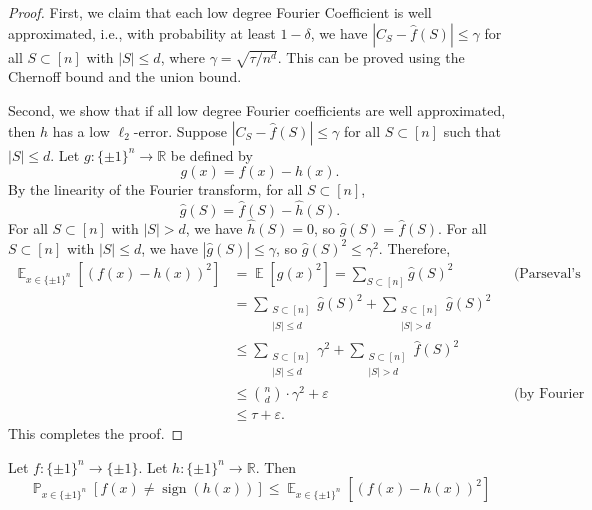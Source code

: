 \documentclass[letterpaper, reqno,11pt]{article}
\newcommand{\RR}{\mathbb{R}}
\newcommand{\PP}{\mathop{{}\mathbb{P}}}
\newcommand{\EE}{\mathop{{}\mathbb{E}}}
\DeclareMathOperator{\sign}{sign}
\begin{document}
\begin{proof}
  First, we claim that each low degree Fourier Coefficient is well approximated, i.e., with probability at least $1 - \delta$, we have $|C_S - \hat{f}(S)| \leq \gamma$ for all $S \subset [n]$ with $|S| \leq d$, where $\gamma = \sqrt{\tau/n^d}$. This can be proved using the Chernoff bound and the union bound.

  Second, we show that if all low degree Fourier coefficients are well approximated, then $h$ has a low $\ell_2$-error. Suppose $|C_S - \hat{f}(S)| \leq \gamma$ for all $S \subset [n]$ such that $|S| \leq d$. Let $g : \{ \pm 1 \}^n \to \RR$ be defined by
  $$ g(x) = f(x) - h(x). $$
  By the linearity of the Fourier transform, for all $S \subset [n]$,
  $$ \hat{g}(S) = \hat{f}(S) - \hat{h}(S). $$
  For all $S \subset [n]$ with $|S| > d$, we have $\hat{h}(S) = 0$, so $\hat{g}(S) = \hat{f}(S)$. For all $S \subset [n]$ with $|S| \leq d$, we have $|\hat{g}(S)| \leq \gamma$, so $\hat{g}(S)^2 \leq \gamma^2$. Therefore,
  \begin{align*}
    \EE_{x \in \{ \pm 1 \}^n}\left[(f(x) - h(x))^2\right] &= \EE\left[g(x)^2\right] = \sum_{S \subset [n]} \hat{g}(S)^2 && \text{(Parseval's identity)} \\
    &= \sum_{\substack{S \subset [n] \\ |S| \leq d}} \hat{g}(S)^2 + \sum_{\substack{S \subset [n] \\ |S| > d}} \hat{g}(S)^2 \\
    &\leq \sum_{\substack{S \subset [n] \\ |S| \leq d}} \gamma^2 + \sum_{\substack{S \subset [n] \\ |S| > d}} \hat{f}(S)^2 \\
    &\leq \binom{n}{d} \cdot \gamma^2 + \varepsilon && \text{(by Fourier concentration)} \\
    &\leq \tau + \varepsilon.
  \end{align*}
  This completes the proof.
\end{proof}

\begin{proposition} \label{prop:prob}
  Let $f : \{ \pm 1 \}^n \to \{ \pm 1 \}$. Let $h : \{ \pm 1 \}^n \to \RR$. Then
  $$ \PP_{x \in \{ \pm 1 \}^n} [f(x) \neq \sign(h(x))] \leq \EE_{x \in \{ \pm 1 \}^n}\left[(f(x) - h(x))^2\right] $$
\end{proposition}
\end{document}
